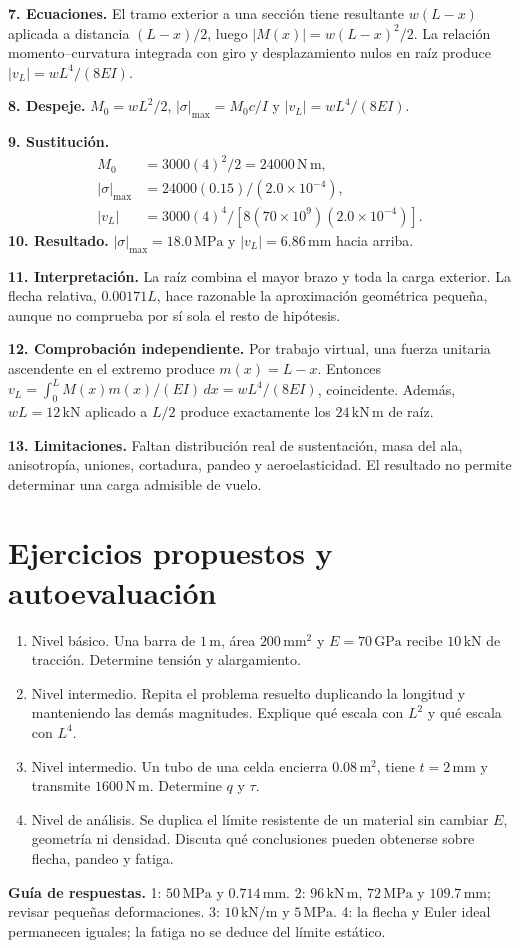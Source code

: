 \textbf{7. Ecuaciones.} El tramo exterior a una sección tiene resultante $w(L-x)$ aplicada a distancia $(L-x)/2$, luego $|M(x)|=w(L-x)^2/2$. La relación momento--curvatura integrada con giro y desplazamiento nulos en raíz produce $|v_L|=wL^4/(8EI)$.

\textbf{8. Despeje.} $M_0=wL^2/2$, $|\sigma|_{\max}=M_0c/I$ y $|v_L|=wL^4/(8EI)$.

\textbf{9. Sustitución.}
\begin{align}
 M_0&=3000(4)^2/2=24000\,\mathrm{N\,m},\\
 |\sigma|_{\max}&=24000(0.15)/(2.0\times10^{-4}),\\
 |v_L|&=3000(4)^4/[8(70\times10^9)(2.0\times10^{-4})].
\end{align}
\textbf{10. Resultado.} $|\sigma|_{\max}=18.0\,\mathrm{MPa}$ y $|v_L|=6.86\,\mathrm{mm}$ hacia arriba.

\textbf{11. Interpretación.} La raíz combina el mayor brazo y toda la carga exterior. La flecha relativa, $0.00171L$, hace razonable la aproximación geométrica pequeña, aunque no comprueba por sí sola el resto de hipótesis.

\textbf{12. Comprobación independiente.} Por trabajo virtual, una fuerza unitaria ascendente en el extremo produce $m(x)=L-x$. Entonces $v_L=\int_0^L M(x)m(x)/(EI)\,dx=wL^4/(8EI)$, coincidente. Además, $wL=12\,\mathrm{kN}$ aplicado a $L/2$ produce exactamente los $24\,\mathrm{kN\,m}$ de raíz.

\textbf{13. Limitaciones.} Faltan distribución real de sustentación, masa del ala, anisotropía, uniones, cortadura, pandeo y aeroelasticidad. El resultado no permite determinar una carga admisible de vuelo.

\section{Ejercicios propuestos y autoevaluación}
\begin{enumerate}
\item Nivel básico. Una barra de $1\,\mathrm{m}$, área $200\,\mathrm{mm^2}$ y $E=70\,\mathrm{GPa}$ recibe $10\,\mathrm{kN}$ de tracción. Determine tensión y alargamiento.
\item Nivel intermedio. Repita el problema resuelto duplicando la longitud y manteniendo las demás magnitudes. Explique qué escala con $L^2$ y qué escala con $L^4$.
\item Nivel intermedio. Un tubo de una celda encierra $0.08\,\mathrm{m^2}$, tiene $t=2\,\mathrm{mm}$ y transmite $1600\,\mathrm{N\,m}$. Determine $q$ y $\tau$.
\item Nivel de análisis. Se duplica el límite resistente de un material sin cambiar $E$, geometría ni densidad. Discuta qué conclusiones pueden obtenerse sobre flecha, pandeo y fatiga.
\end{enumerate}
\textbf{Guía de respuestas.} 1: $50\,\mathrm{MPa}$ y $0.714\,\mathrm{mm}$. 2: $96\,\mathrm{kN\,m}$, $72\,\mathrm{MPa}$ y $109.7\,\mathrm{mm}$; revisar pequeñas deformaciones. 3: $10\,\mathrm{kN/m}$ y $5\,\mathrm{MPa}$. 4: la flecha y Euler ideal permanecen iguales; la fatiga no se deduce del límite estático.

